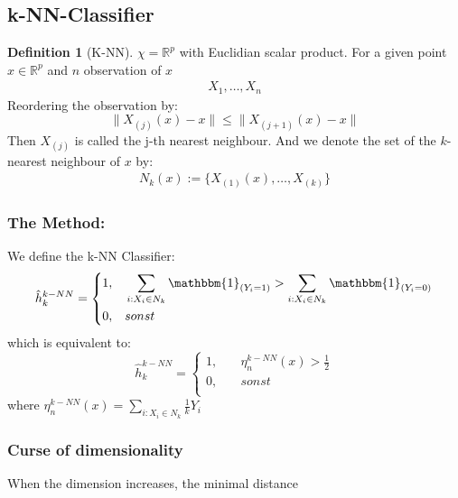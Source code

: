 \documentclass[a4paper,12pt, oneside, fleqn]{book}
\theoremstyle{definition}
\newtheorem{definition}{Definition}[section]
\theoremstyle{remark}
\begin{document}
\subsection{k-NN-Classifier}
\begin{definition}[K-NN]
$\chi = \mathbb{R}^p$ with Euclidian scalar product. For a given point $x \in  \mathbb{R}^p$ and $n$ observation of $x$
\begin{align*}
	X_1, \dots, X_n
\end{align*}
Reordering the observation by:
\begin{equation*}
	\|X_{(j)}(x) - x \| \leq  \| X_{(j + 1)}(x) - x \|
\end{equation*}
Then $X_{(j)}$ is called the j-th nearest neighbour. And we denote the set of the $k$-nearest neighbour of $x$ by:
\begin{align*}
	N_k(x):= \{X_{(1)}(x), \dots , X_{(k)} \}
\end{align*}
	
\end{definition}

\subsubsection*{The Method:}
We define the k-NN Classifier:
\begin{equation*}
	\hat{h}_k^{k-NN} = 
	\left\{ 
	\begin{aligned}
		1, \quad & \sum_{i: X_i \in N_k} \mathbbm{1}_{(Y_i = 1)} > \sum_{i: X_i \in N_k} \mathbbm{1}_{(Y_i = 0)} \\
		0, \quad & sonst \\
	\end{aligned}\right.
\end{equation*}
which is equivalent to:
\begin{equation*}
	\hat{h}_k^{k-NN} = 
	\left\{ 
	\begin{aligned}
		1, \quad & \eta_n^{k-NN}(x) > \frac{1}{2} \\
		0, \quad & sonst \\
	\end{aligned}\right.	
\end{equation*}
where $\eta_n^{k-NN}(x) = \sum_{i: X_i \in N_k} \frac{1}{k} Y_i $

\subsubsection*{Curse of dimensionality}
When the dimension increases, the minimal distance
\end{document}

